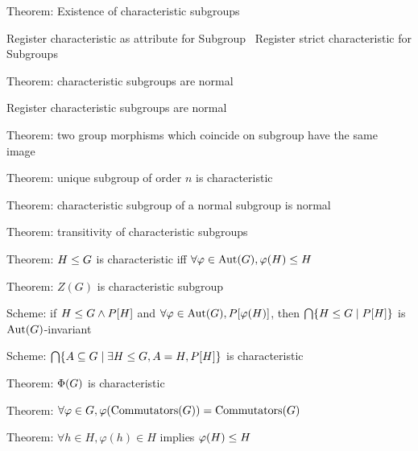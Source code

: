 \LA{}Theorem: Existence of characteristic subgroups~{\nwtagstyle{}}\RA{}

\LA{}Register \code{}characteristic\edoc{} as attribute for Subgroup~{\nwtagstyle{}}\RA{}
\LA{}Register \code{}strict\edoc{} \code{}characteristic\edoc{} for Subgroups~{\nwtagstyle{}}\RA{}

\LA{}Theorem: characteristic subgroups are normal~{\nwtagstyle{}}\RA{}

\LA{}Register characteristic subgroups are normal~{\nwtagstyle{}}\RA{}

\LA{}Theorem: two group morphisms which coincide on subgroup have the same image~{\nwtagstyle{}}\RA{}

\LA{}Theorem: unique subgroup of order $n$ is \code{}characteristic\edoc{}~{\nwtagstyle{}}\RA{}

\LA{}Theorem: characteristic subgroup of a normal subgroup is normal~{\nwtagstyle{}}\RA{}

\LA{}Theorem: transitivity of characteristic subgroups~{\nwtagstyle{}}\RA{}

\LA{}Theorem: $H\leq G$ is characteristic iff $\forall\varphi\in\operatorname{Aut}(G),\varphi(H)\leq H$~{\nwtagstyle{}}\RA{}

\LA{}Theorem: $Z(G)$ is characteristic subgroup~{\nwtagstyle{}}\RA{}

\LA{}Scheme: if $H\leq G\land P[H]$ and $\forall\varphi\in\operatorname{Aut}(G),P[\varphi(H)]$, then $\bigcap\{H\leq G\mid P[H]\}$ is $\operatorname{Aut}(G)$-invariant~{\nwtagstyle{}}\RA{}

\LA{}Scheme: $\bigcap\{A\subseteq G\mid\exists H\leq G, A=H, P[H]\}$ is characteristic~{\nwtagstyle{}}\RA{}

\LA{}Theorem: $\operatorname{\Phi}(G)$ is characteristic~{\nwtagstyle{}}\RA{}

\LA{}Theorem: $\forall\varphi\in G,\varphi(\operatorname{Commutators}(G))=\operatorname{Commutators}(G)$~{\nwtagstyle{}}\RA{}

\LA{}Theorem: $\forall h\in H,\varphi(h)\in H$ implies $\varphi(H)\leq H$~{\nwtagstyle{}}\RA{}

